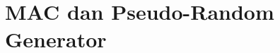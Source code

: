 \documentclass[../main.tex]{subfiles}
\begin{document}
\chapter{MAC dan Pseudo-Random Generator}
\end{document}
